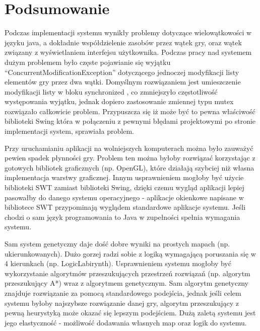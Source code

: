 \chapter{Podsumowanie}
\begin{par}
	Podczas implementacji systemu wynikły problemy dotyczące wielowątkowości w języku java, a dokładnie współdzielenie zasobów przez wątek gry, oraz wątek związany z wyświetlaniem interfejsu użytkownika. Podczas pracy nad systemem dużym problemem było częste pojawianie się wyjątku ``ConcurrentModificationException'' dotyczącego jednoczej modyfikacji listy elementów gry przez dwa wątki. Domyślnym rozwiązaniem jest umieszczenie modyfikacji listy w bloku synchronized{ }, co zmniejszyło częstotliwość występowania wyjątku, jednak dopiero zastosowanie zmiennej typu mutex rozwiązało całkowicie problem. Przypuszcza się iż może być to pewna właściwość biblioteki Swing która w połączeniu z pewnymi błędami projektowymi po stronie implementacji system, sprawiała problem.
\end{par}
\begin{par}
	Przy uruchamianiu aplikacji na wolniejszych komputerach można było zauważyć pewien spadek płynności gry. Problem ten można byłoby rozwiązać korzystając z gotowych bibliotek graficznych (np. OpenGL), które działają szybciej niż własna implementacja warstwy graficznej. Innym usprawnieniem mogłoby być użycie biblioteki SWT zamiast biblioteki Swing, dzięki czemu wygląd aplikacji lepiej pasowałby do danego systemu operacyjnego - aplikacje okienkowe napisane w bibliotece SWT przypominają wyglądem standardowe aplikacje systemu. Jeśli chodzi o sam język programowania to Java w zupełności spełnia wymagania systemu.
\end{par}
\begin{par}
	Sam system genetyczny daje dość dobre wyniki na prostych mapach (np. ukierunkowanych). Dużo gorzej radzi sobie z logiką wymagającą poruszania się w 4 kierunkach (np. LogicLabirynth). Usprawnieniem systemu mogłoby być wykorzystanie algorytmów przeszukujących przestrzeń rozwiązań (np. algorytm przeszukujący A*) wraz z algorytmem genetycznym. Sam algorytm genetyczny znajduje rozwiązanie za pomocą standardowego podejścia, jednak jeśli celem systemu byłoby najszybsze rozwiązanie danej gry, algorytm przeszukujący z pewną heurystyką może okazać się lepszym podejściem. Dużą zaletą systemu jest jego elastyczność - możliwość dodawania własnych map oraz logik do systemu.
\end{par}
